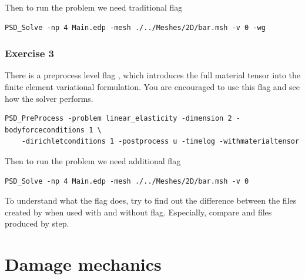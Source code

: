 Then to run the problem we need traditional  flag

\begin{lstlisting}[style=BashInputStyle]
	PSD_Solve -np 4 Main.edp -mesh ./../Meshes/2D/bar.msh -v 0 -wg
\end{lstlisting}

\subsubsection{Exercise  3}

There is a preprocess level flag , which introduces the full material tensor into the finite element variational formulation. You are encouraged to use this flag and see how the solver performs.

\begin{lstlisting}[style=BashInputStyle]
	PSD_PreProcess -problem linear_elasticity -dimension 2 -bodyforceconditions 1 \
	-dirichletconditions 1 -postprocess u -timelog -withmaterialtensor
\end{lstlisting}

Then to run the problem we need additional  flag

\begin{lstlisting}[style=BashInputStyle]
	PSD_Solve -np 4 Main.edp -mesh ./../Meshes/2D/bar.msh -v 0
\end{lstlisting}

To understand what the flag does, try to find out the difference between the files created by  when used with and without   flag. Especially, compare   and  files produced by  step.


\pagebreak













\section{Damage mechanics}
